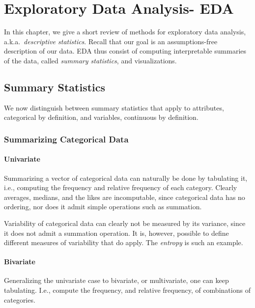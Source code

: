 \documentclass[12pt,a4paper]{report}
\begin{document}
\chapter{Exploratory Data Analysis- EDA}
In this chapter, we give a short review of methods for exploratory data analysis, a.k.a.\ \emph{descriptive statistics}.
Recall that our goal is an assumptions-free description of our data. 
EDA thus consist of computing interpretable summaries of the data, called \emph{summary statistics}, and visualizations. 


\section{Summary Statistics}
\label{sec:summary_statistics}

We now distinguish between summary statistics that apply to attributes, categorical by definition, and variables, continuous by definition. 


\subsection{Summarizing Categorical Data}

\subsubsection{Univariate}
Summarizing a vector of categorical data can naturally be done by tabulating it, i.e., computing the frequency and relative frequency of each category.
Clearly averages, medians, and the likes are incomputable, since categorical data has no ordering, nor does it admit simple operations such as summation.

\begin{extra}
Variability of categorical data can clearly not be measured by its variance, since it does not admit a summation operation.
It is, however, possible to define different measures of variability that do apply.
The \emph{entropy} is such an example.
\end{extra}


\subsubsection{Bivariate}
Generalizing the univariate case to bivariate, or multivariate, one can keep tabulating. I.e., compute the frequency, and relative frequency, of combinations of categories.
\end{document}
